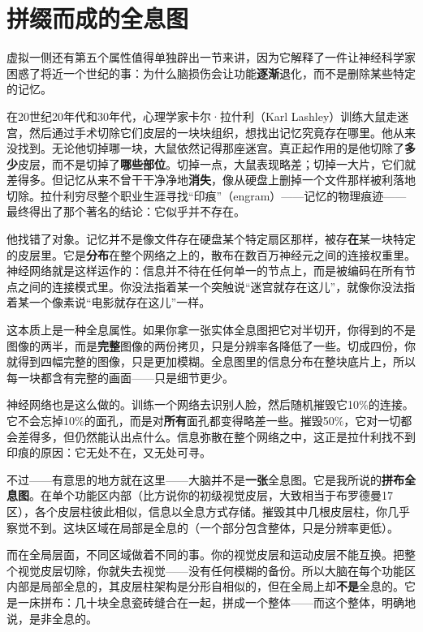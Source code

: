\documentclass[11pt, twoside, openright]{book}
\begin{document}
\section*{拼缀而成的全息图}

虚拟一侧还有第五个属性值得单独辟出一节来讲，因为它解释了一件让神经科学家困惑了将近一个世纪的事：为什么脑损伤会让功能\textbf{逐渐}退化，而不是删除某些特定的记忆。

在20世纪20年代和30年代，心理学家卡尔·拉什利（Karl Lashley）训练大鼠走迷宫，然后通过手术切除它们皮层的一块块组织，想找出记忆究竟存在哪里。他从来没找到。无论他切掉哪一块，大鼠依然记得那座迷宫。真正起作用的是他切除了\textbf{多少}皮层，而不是切掉了\textbf{哪些部位}。切掉一点，大鼠表现略差；切掉一大片，它们就差得多。但记忆从来不曾干干净净地\textbf{消失}，像从硬盘上删掉一个文件那样被利落地切除。拉什利穷尽整个职业生涯寻找“印痕”（engram）------记忆的物理痕迹------最终得出了那个著名的结论：它似乎并不存在。

他找错了对象。记忆并不是像文件存在硬盘某个特定扇区那样，被存\textbf{在}某一块特定的皮层里。它是\textbf{分布}在整个网络之上的，散布在数百万神经元之间的连接权重里。神经网络就是这样运作的：信息并不待在任何单一的节点上，而是被编码在所有节点之间的连接模式里。你没法指着某一个突触说“迷宫就存在这儿”，就像你没法指着某一个像素说“电影就存在这儿”一样。

这本质上是一种全息属性。如果你拿一张实体全息图把它对半切开，你得到的不是图像的两半，而是\textbf{完整}图像的两份拷贝，只是分辨率各降低了一些。切成四份，你就得到四幅完整的图像，只是更加模糊。全息图里的信息分布在整块底片上，所以每一块都含有完整的画面------只是细节更少。

神经网络也是这么做的。训练一个网络去识别人脸，然后随机摧毁它10\%的连接。它不会忘掉10\%的面孔，而是对\textbf{所有}面孔都变得略差一些。摧毁50\%，它对一切都会差得多，但仍然能认出点什么。信息弥散在整个网络之中，这正是拉什利找不到印痕的原因：它无处不在，又无处可寻。

不过------有意思的地方就在这里------大脑并不是\textbf{一张}全息图。它是我所说的\textbf{拼布全息图}。在单个功能区内部（比方说你的初级视觉皮层，大致相当于布罗德曼17区），各个皮层柱彼此相似，信息以全息方式存储。摧毁其中几根皮层柱，你几乎察觉不到。这块区域在局部是全息的（一个部分包含整体，只是分辨率更低）。

而在全局层面，不同区域做着不同的事。你的视觉皮层和运动皮层不能互换。把整个视觉皮层切除，你就失去视觉------没有任何模糊的备份。所以大脑在每个功能区内部是局部全息的，其皮层柱架构是分形自相似的，但在全局上却\textbf{不是}全息的。它是一床拼布：几十块全息瓷砖缝合在一起，拼成一个整体------而这个整体，明确地说，是非全息的。
\end{document}
